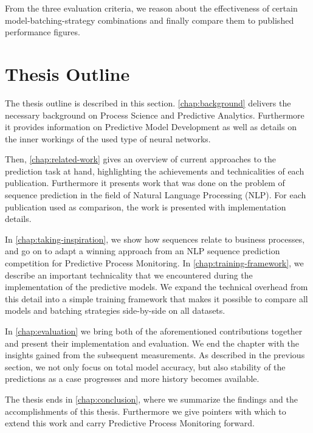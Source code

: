From the three evaluation criteria, we reason about the effectiveness of certain model-batching-strategy combinations and finally compare them to published performance figures.

\section{Thesis Outline}\label{sec:intro:outline}
The thesis outline is described in this section. \autoref{chap:background} delivers the necessary background on Process Science and Predictive Analytics. Furthermore it provides information on Predictive Model Development as well as details on the inner workings of the used type of neural networks.

Then, \autoref{chap:related-work} gives an overview of current approaches to the prediction task at hand, highlighting the achievements and technicalities of each publication. Furthermore it presents work that was done on the problem of sequence prediction in the field of Natural Language Processing (NLP). For each publication used as comparison, the work is presented with implementation details.

In \autoref{chap:taking-inspiration}, we show how sequences relate to business processes, and go on to adapt a winning approach from an NLP sequence prediction competition for Predictive Process Monitoring. In \autoref{chap:training-framework}, we describe an important technicality that we encountered during the implementation of the predictive models. We expand the technical overhead from this detail into a simple training framework that makes it possible to compare all models and batching strategies side-by-side on all datasets.

In \autoref{chap:evaluation} we bring both of the aforementioned contributions together and present their implementation and evaluation. We end the chapter with the insights gained from the subsequent measurements. As described in the previous section, we not only focus on total model accuracy, but also stability of the predictions as a case progresses and more history becomes available.

The thesis ends in \autoref{chap:conclusion}, where we summarize the findings and the accomplishments of this thesis. Furthermore we give pointers with which to extend this work and carry Predictive Process Monitoring forward.
